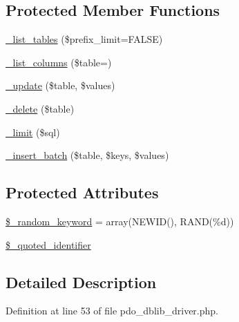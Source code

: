 \subsection*{Protected Member Functions}
\begin{DoxyCompactItemize}
\item 
\mbox{\hyperlink{class_c_i___d_b__pdo__dblib__driver_a435c0f3ce54fe7daa178baa8532ebd54}{\+\_\+list\+\_\+tables}} (\$prefix\+\_\+limit=F\+A\+L\+SE)
\item 
\mbox{\hyperlink{class_c_i___d_b__pdo__dblib__driver_a7ccb7f9c301fe7f0a9db701254142b63}{\+\_\+list\+\_\+columns}} (\$table=\textquotesingle{}\textquotesingle{})
\item 
\mbox{\hyperlink{class_c_i___d_b__pdo__dblib__driver_a2540b03a93fa73ae74c10d0e16fc073e}{\+\_\+update}} (\$table, \$values)
\item 
\mbox{\hyperlink{class_c_i___d_b__pdo__dblib__driver_a133ea8446ded52589bd22cc9163d0896}{\+\_\+delete}} (\$table)
\item 
\mbox{\hyperlink{class_c_i___d_b__pdo__dblib__driver_a3a02ea06541b8ecc25a33a61651562c8}{\+\_\+limit}} (\$sql)
\item 
\mbox{\hyperlink{class_c_i___d_b__pdo__dblib__driver_a1978e1358c812587a46e242630365099}{\+\_\+insert\+\_\+batch}} (\$table, \$keys, \$values)
\end{DoxyCompactItemize}
\subsection*{Protected Attributes}
\begin{DoxyCompactItemize}
\item 
\mbox{\hyperlink{class_c_i___d_b__pdo__dblib__driver_a10213aa6e05f6d924d3277bb1d2fea00}{\$\+\_\+random\+\_\+keyword}} = array(\textquotesingle{}N\+E\+W\+ID()\textquotesingle{}, \textquotesingle{}R\+A\+ND(\%d)\textquotesingle{})
\item 
\mbox{\hyperlink{class_c_i___d_b__pdo__dblib__driver_a1dae2f0e9ad7299438a9976d6cdbf2ad}{\$\+\_\+quoted\+\_\+identifier}}
\end{DoxyCompactItemize}


\subsection{Detailed Description}


Definition at line 53 of file pdo\+\_\+dblib\+\_\+driver.\+php.




